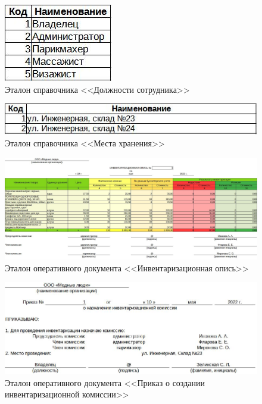 \documentclass[12pt, a4paper, simple]{eskdtext}
\begin{document}
    \begin{figure}[!h]
        \centering
        \includegraphics[]
            {_docs/СП_ДолжнСотр_эталон.jpg}
        \caption{Эталон справочника <<Должности сотрудника>>}
        \label{fig:CP_DoljSotr_etalon}
    \end{figure}

    \begin{figure}[!h]
        \centering
        \includegraphics[]
            {_docs/СП_МестаХран_эталон.jpg}
        \caption{Эталон справочника <<Места хранения>>}
        \label{fig:CP_MestaXran_etalon}
    \end{figure}

    \begin{figure}[!h]
        \centering
        \includegraphics[width=18cm]
            {_docs/ОП_ИнвенОпис_эталон.jpg}
        \caption{Эталон оперативного документа <<Инвентаризационная опись>>}
        \label{fig:OP_InvenOpis_etalon}
    \end{figure}

    \begin{figure}[!h]
        \centering
        \includegraphics[width=18cm]
            {_docs/ОП_ПриказСоздКомИнвент_эталон.jpg}
        \caption{Эталон оперативного документа <<Приказ о создании инвентаризационной комиссии>>}
        \label{fig:OP_PrikazSozdKomInvest_etalon}
    \end{figure}
\end{document}
